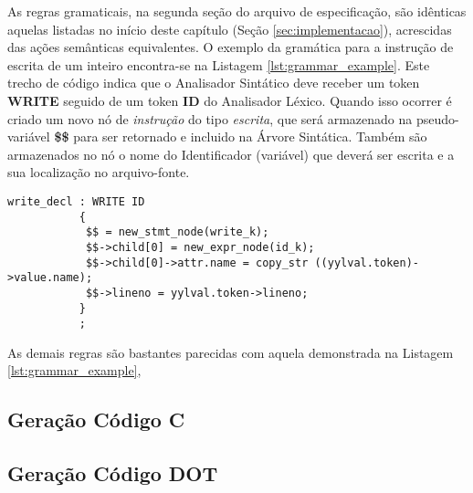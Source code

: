 As regras gramaticais, na segunda seção do arquivo de especificação, são
idênticas aquelas listadas no início deste capítulo (Seção
\ref{sec:implementacao}), acrescidas das ações semânticas equivalentes. O
exemplo da gramática para a instrução de escrita de um inteiro encontra-se
na Listagem \ref{lst:grammar_example}. Este trecho de código indica que o
Analisador Sintático deve receber um token \textbf{WRITE} seguido de um token
\textbf{ID} do Analisador Léxico. Quando isso ocorrer é criado um novo nó de
\emph{instrução} do tipo \emph{escrita}, que será armazenado na
pseudo-variável \textbf{\$\$} para ser retornado e incluido na Árvore
Sintática. Também são armazenados no nó o nome do Identificador (variável) que
deverá ser escrita e a sua localização no arquivo-fonte.

\begin{lstlisting}[label=lst:grammar_example,caption=Exemplo da Gramática com
Regras Semânticas]
write_decl : WRITE ID
           {
            $$ = new_stmt_node(write_k);
            $$->child[0] = new_expr_node(id_k);
            $$->child[0]->attr.name = copy_str ((yylval.token)->value.name);
            $$->lineno = yylval.token->lineno;
           }
           ;
\end{lstlisting}

As demais regras são bastantes parecidas com aquela demonstrada na Listagem
\ref{lst:grammar_example}, 


\subsection{Geração Código C}
\label{sec:gen_c}

\subsection{Geração Código DOT}
\label{sec:gen_dot}
